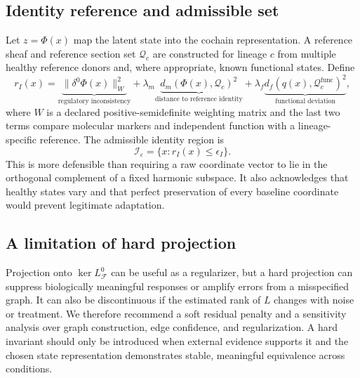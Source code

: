 \documentclass[11pt,a4paper]{article}
\theoremstyle{definition}
\theoremstyle{remark}
\newcommand{\Fsh}{\mathcal{F}}
\newcommand{\Iset}{\mathcal{I}_{\varepsilon}}
\begin{document}
\subsection{Identity reference and admissible set}
Let $z=\Phi(x)$ map the latent state into the cochain representation. A reference sheaf and reference section set $\mathcal{Q}_{c}$ are constructed for lineage $c$ from multiple healthy reference donors and, where appropriate, known functional states. Define
\begin{equation}
r_I(x)=\underbrace{\|\delta^0\Phi(x)\|_{W}^{2}}_{\text{regulatory inconsistency}}
+\lambda_m\underbrace{d_m(\Phi(x),\mathcal{Q}_{c})^2}_{\text{distance to reference identity}}
+\lambda_f\underbrace{d_f(q(x),\mathcal{Q}_{c}^{\mathrm{func}})^2}_{\text{functional deviation}},
\label{eq:identity_residual}
\end{equation}
where $W$ is a declared positive-semidefinite weighting matrix and the last two terms compare molecular markers and independent function with a lineage-specific reference. The admissible identity region is
\begin{equation}
\Iset=\{x:r_I(x)\leq\epsilon_I\}.
\end{equation}
This is more defensible than requiring a raw coordinate vector to lie in the orthogonal complement of a fixed harmonic subspace. It also acknowledges that healthy states vary and that perfect preservation of every baseline coordinate would prevent legitimate adaptation.

\subsection{A limitation of hard projection}
Projection onto $\ker L_{\Fsh}^0$ can be useful as a regularizer, but a hard projection can suppress biologically meaningful responses or amplify errors from a misspecified graph. It can also be discontinuous if the estimated rank of $L$ changes with noise or treatment. We therefore recommend a soft residual penalty and a sensitivity analysis over graph construction, edge confidence, and regularization. A hard invariant should only be introduced when external evidence supports it and the chosen state representation demonstrates stable, meaningful equivalence across conditions.
\end{document}
